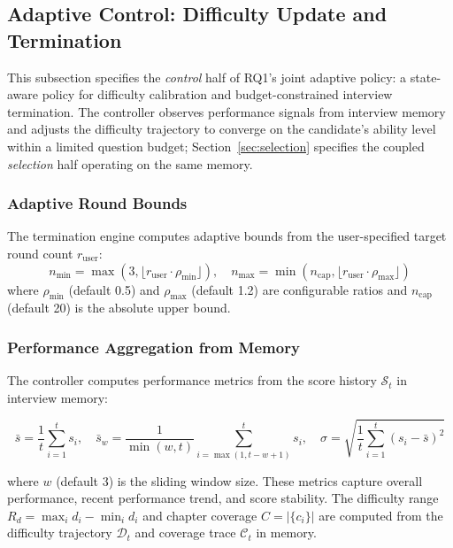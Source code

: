 ﻿\documentclass[final,3p,times,authoryear]{elsarticle}
\begin{document}
\subsection{Adaptive Control: Difficulty Update and Termination}
\label{sec:adaptive_control}

\noindent This subsection specifies the \emph{control} half of RQ1's joint adaptive policy: a state-aware policy for difficulty calibration and budget-constrained interview termination. The controller observes performance signals from interview memory and adjusts the difficulty trajectory to converge on the candidate's ability level within a limited question budget; Section~\ref{sec:selection} specifies the coupled \emph{selection} half operating on the same memory.

\subsubsection{Adaptive Round Bounds}

\noindent The termination engine computes adaptive bounds from the user-specified target round count $r_{\text{user}}$:
\begin{equation}
n_{\min} = \max\left(3, \lfloor r_{\text{user}} \cdot \rho_{\min} \rfloor\right), \quad
n_{\max} = \min\left(n_{\text{cap}}, \lfloor r_{\text{user}} \cdot \rho_{\max} \rfloor\right)
\end{equation}
where $\rho_{\min}$ (default 0.5) and $\rho_{\max}$ (default 1.2) are configurable ratios and $n_{\text{cap}}$ (default 20) is the absolute upper bound.

\subsubsection{Performance Aggregation from Memory}

\noindent The controller computes performance metrics from the score history $\mathcal{S}_t$ in interview memory:

\begin{equation}
\bar{s} = \frac{1}{t} \sum_{i=1}^{t} s_i, \quad
\bar{s}_w = \frac{1}{\min(w, t)} \sum_{i=\max(1, t-w+1)}^{t} s_i, \quad
\sigma = \sqrt{\frac{1}{t} \sum_{i=1}^{t} (s_i - \bar{s})^2}
\end{equation}

where $w$ (default 3) is the sliding window size. These metrics capture overall performance, recent performance trend, and score stability. The difficulty range $R_d = \max_i d_i - \min_i d_i$ and chapter coverage $C = |\{c_i\}|$ are computed from the difficulty trajectory $\mathcal{D}_t$ and coverage trace $\mathcal{C}_t$ in memory.
\end{document}
